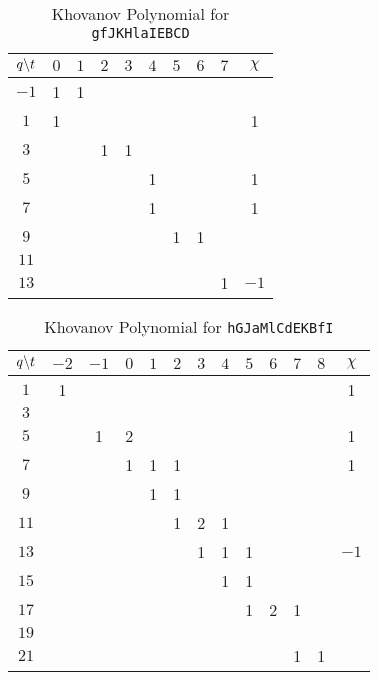     \begin{table}
        \centering
        \begin{tabular}{| c | c | c | c | c | c | c | c | c | c |}
            \hline
            $q\symbol{92}t$&$0$&$1$&$2$&$3$&$4$&$5$&$6$&$7$&$\chi$\\
            \hline
            $-1$&1&1&&&&&&&\\
            \hline
            $1$&1&&&&&&&&1\\
            \hline
            $3$&&&1&1&&&&&\\
            \hline
            $5$&&&&&1&&&&1\\
            \hline
            $7$&&&&&1&&&&1\\
            \hline
            $9$&&&&&&1&1&&\\
            \hline
            $11$&&&&&&&&&\\
            \hline
            $13$&&&&&&&&1&$-1$\\
            \hline
        \end{tabular}
        \caption{Khovanov Polynomial for \texttt{gfJKHlaIEBCD}}
        \label{table:gfJKHlaIEBCD_kho}
    \end{table}
    \begin{table}
        \centering
        \begin{tabular}{| c | c | c | c | c | c | c | c | c | c | c | c | c |}
            \hline
            $q\symbol{92}t$&$-2$&$-1$&$0$&$1$&$2$&$3$&$4$&$5$&$6$&$7$&$8$&$\chi$\\
            \hline
            $1$&1&&&&&&&&&&&1\\
            \hline
            $3$&&&&&&&&&&&&\\
            \hline
            $5$&&1&2&&&&&&&&&1\\
            \hline
            $7$&&&1&1&1&&&&&&&1\\
            \hline
            $9$&&&&1&1&&&&&&&\\
            \hline
            $11$&&&&&1&2&1&&&&&\\
            \hline
            $13$&&&&&&1&1&1&&&&$-1$\\
            \hline
            $15$&&&&&&&1&1&&&&\\
            \hline
            $17$&&&&&&&&1&2&1&&\\
            \hline
            $19$&&&&&&&&&&&&\\
            \hline
            $21$&&&&&&&&&&1&1&\\
            \hline
        \end{tabular}
        \caption{Khovanov Polynomial for \texttt{hGJaMlCdEKBfI}}
        \label{table:hGJaMlCdEKBfI_kho}
    \end{table}
